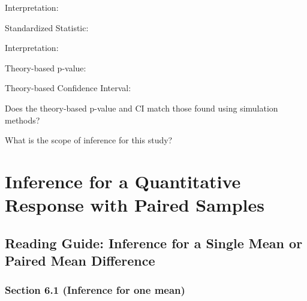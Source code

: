 \documentclass[
]{report}
\newcommand{\rgi}{\hspace{24pt}}  %
\begin{document}
\vspace{0.3in}

\rgi \rgi Interpretation:

\vspace{0.8in}

\rgi Standardized Statistic:

\vspace{0.3in}

\rgi \rgi Interpretation:

\vspace{0.8in}

\rgi Theory-based p-value:

\vspace{0.3in}

\rgi Theory-based Confidence Interval:

\vspace{0.5in}

\rgi Does the theory-based p-value and CI match those found using simulation methods?

\vspace{0.8in}

\rgi What is the scope of inference for this study?

\vspace{0.8in}

\newpage

\hypertarget{inference-for-a-quantitative-response-with-paired-samples}{%
\chapter{Inference for a Quantitative Response with Paired Samples}\label{inference-for-a-quantitative-response-with-paired-samples}}

\hypertarget{reading-guide-inference-for-a-single-mean-or-paired-mean-difference}{%
\section{Reading Guide: Inference for a Single Mean or Paired Mean Difference}\label{reading-guide-inference-for-a-single-mean-or-paired-mean-difference}}

\hypertarget{section-6.1-inference-for-one-mean}{%
\subsection*{Section 6.1 (Inference for one mean)}\label{section-6.1-inference-for-one-mean}}
\end{document}
